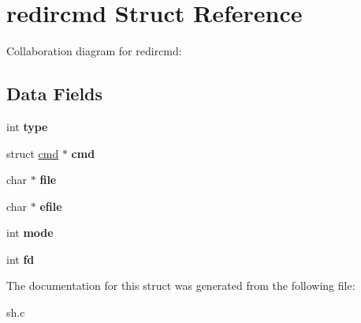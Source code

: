 \hypertarget{structredircmd}{}\section{redircmd Struct Reference}
\label{structredircmd}


Collaboration diagram for redircmd\+:
\subsection*{Data Fields}
\begin{DoxyCompactItemize}
\item 
\mbox{\label{structredircmd_ac3e4a2de55ca2175ede05a3f49bbb835}} 
int {\bfseries type}
\item 
\mbox{\label{structredircmd_ad0e2824b83cc8a1da99b2922025011dc}} 
struct \mbox{\hyperlink{structcmd}{cmd}} $\ast$ {\bfseries cmd}
\item 
\mbox{\label{structredircmd_adfbfcf9111724e5b453bab2ed3ee308f}} 
char $\ast$ {\bfseries file}
\item 
\mbox{\label{structredircmd_a7bd00698c6fbc539415332f187d78317}} 
char $\ast$ {\bfseries efile}
\item 
\mbox{\label{structredircmd_a36b522983b6a0c0efdaea471b08d120b}} 
int {\bfseries mode}
\item 
\mbox{\label{structredircmd_a1d4b8ba36b5bb4e9e4af58a6d58934a1}} 
int {\bfseries fd}
\end{DoxyCompactItemize}


The documentation for this struct was generated from the following file\+:\begin{DoxyCompactItemize}
\item 
sh.\+c\end{DoxyCompactItemize}
